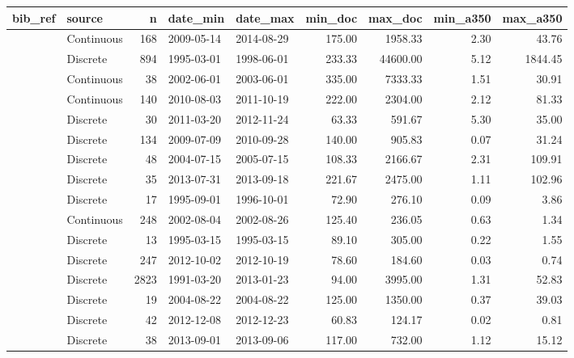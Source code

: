 \begin{table}[ht]
\centering
\begingroup\footnotesize
\begin{tabular}{llrllrrrr}
  \hline
bib\_ref & source & n & date\_min & date\_max & min\_doc & max\_doc & min\_a350 & max\_a350 \\ 
  \hline
\citet{agro} & Continuous & 168 & 2009-05-14 & 2014-08-29 & 175.00 & 1958.33 & 2.30 & 43.76 \\ 
  \citet{Aiken2005} & Discrete & 894 & 1995-03-01 & 1998-06-01 & 233.33 & 44600.00 & 5.12 & 1844.45 \\ 
  \citet{Anderson2007} & Continuous &  38 & 2002-06-01 & 2003-06-01 & 335.00 & 7333.33 & 1.51 & 30.91 \\ 
  \citet{Asmala2014} & Continuous & 140 & 2010-08-03 & 2011-10-19 & 222.00 & 2304.00 & 2.12 & 81.33 \\ 
  \citet{Bouillon2014} & Discrete &  30 & 2011-03-20 & 2012-11-24 & 63.33 & 591.67 & 5.30 & 35.00 \\ 
  \citet{Braun2015} & Discrete & 134 & 2009-07-09 & 2010-09-28 & 140.00 & 905.83 & 0.07 & 31.24 \\ 
  \citet{Breton2009} & Discrete &  48 & 2004-07-15 & 2005-07-15 & 108.33 & 2166.67 & 2.31 & 109.91 \\ 
  \citet{Brezonik2015} & Discrete &  35 & 2013-07-31 & 2013-09-18 & 221.67 & 2475.00 & 1.11 & 102.96 \\ 
  \citet{Castillo1999} & Discrete &  17 & 1995-09-01 & 1996-10-01 & 72.90 & 276.10 & 0.09 & 3.86 \\ 
  \citet{Conan2007} & Continuous & 248 & 2002-08-04 & 2002-08-26 & 125.40 & 236.05 & 0.63 & 1.34 \\ 
  \citet{Delcastillo2000} & Discrete &  13 & 1995-03-15 & 1995-03-15 & 89.10 & 305.00 & 0.22 & 1.55 \\ 
  \citet{Engel2015} & Discrete & 247 & 2012-10-02 & 2012-10-19 & 78.60 & 184.60 & 0.03 & 0.74 \\ 
  \citet{Finishriver2016} & Discrete & 2823 & 1991-03-20 & 2013-01-23 & 94.00 & 3995.00 & 1.31 & 52.83 \\ 
  \citet{Forsstrom2015} & Discrete &  19 & 2004-08-22 & 2004-08-22 & 125.00 & 1350.00 & 0.37 & 39.03 \\ 
  \citet{Galgani2016} & Discrete &  42 & 2012-12-08 & 2012-12-23 & 60.83 & 124.17 & 0.02 & 0.81 \\ 
  \citet{Goncalves2015} & Discrete &  38 & 2013-09-01 & 2013-09-06 & 117.00 & 732.00 & 1.12 & 15.12 \\ 

\end{tabular}
\end{table}

